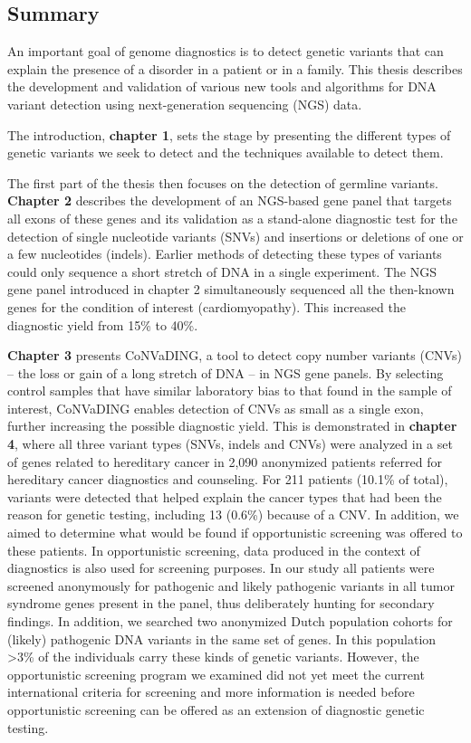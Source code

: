 \begin{appendices}
	
	\chapter{Summary}
	An important goal of genome diagnostics is to detect genetic variants that can explain the presence of a disorder in a patient or in a family. This thesis describes the development and validation of various new tools and algorithms for DNA variant detection using next-generation sequencing (NGS) data.
	
	The introduction, \textbf{chapter 1}, sets the stage by presenting the different types of genetic variants we seek to detect and the techniques available to detect them.
	
	The first part of the thesis then focuses on the detection of germline variants. \textbf{Chapter 2} describes the development of an NGS-based gene panel that targets all exons of these genes and its validation as a stand-alone diagnostic test for the detection of single nucleotide variants (SNVs) and insertions or deletions of one or a few nucleotides (indels). Earlier methods of detecting these types of variants could only sequence a short stretch of DNA in a single experiment. The NGS gene panel introduced in chapter 2 simultaneously sequenced all the then-known genes for the condition of interest (cardiomyopathy). This increased the diagnostic yield from 15\% to 40\%.
	 
	\textbf{Chapter 3} presents CoNVaDING, a tool to detect copy number variants (CNVs) – the loss or gain of a long stretch of DNA – in NGS gene panels. By selecting control samples that have similar laboratory bias to that found in the sample of interest, CoNVaDING enables detection of CNVs as small as a single exon, further increasing the possible diagnostic yield. This is demonstrated in \textbf{chapter 4}, where all three variant types (SNVs, indels and CNVs) were analyzed in a set of genes related to hereditary cancer in 2,090 anonymized patients referred for hereditary cancer diagnostics and counseling. For 211 patients (10.1\% of total), variants were detected that helped explain the cancer types that had been the reason for genetic testing, including 13 (0.6\%) because of a CNV. In addition, we aimed to determine what would be found if opportunistic screening was offered to these patients. In opportunistic screening, data produced in the context of diagnostics is also used for screening purposes. In our study all patients were screened anonymously for pathogenic and likely pathogenic variants in all tumor syndrome genes present in the panel, thus deliberately hunting for secondary findings. In addition, we searched two anonymized Dutch population cohorts for (likely) pathogenic DNA variants in the same set of genes. In this population \textgreater3\% of the individuals carry these kinds of genetic variants. However, the opportunistic screening program we examined did not yet meet the current international criteria for screening and more information is needed before opportunistic screening can be offered as an extension of diagnostic genetic testing.
	

\end{appendices}
